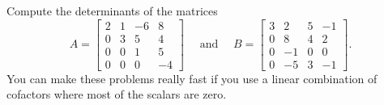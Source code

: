 \begin{problem}
 Compute the determinants of the matrices 
$$
A=
\begin{bmatrix}
 2 & 1 & -6 & 8 \\
 0 & 3 & 5 & 4 \\
 0 & 0 & 1 & 5 \\
 0 & 0 & 0 & -4
\end{bmatrix}
\quad\text{ and }\quad
B=
\begin{bmatrix}
 3 & 2 & 5 & -1 \\
 0 & 8 & 4 & 2 \\
 0 & -1 & 0 & 0 \\
 0 & -5 & 3 & -1
\end{bmatrix}
.$$
You can make these problems really fast if you use a linear combination of cofactors where most of the scalars are zero. 
\end{problem}








